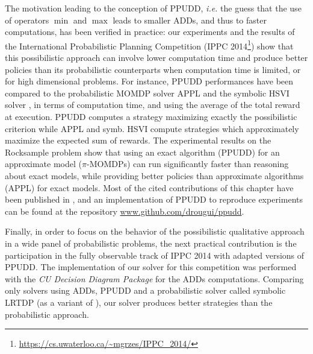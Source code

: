 The motivation leading to the conception of PPUDD,
\textit{i.e.} the guess that the use of operators $\min$ and $\max$ 
leads to smaller ADDs, and thus to faster computations,
has been verified in practice:
our experiments and the results 
of the International Probabilistic Planning Competition (IPPC 2014\footnote{\url{https://cs.uwaterloo.ca/~mgrzes/IPPC_2014/}})
show that this possibilistic approach
can involve lower computation time
and produce better policies
than its probabilistic counterparts
when computation time is limited,
or for high dimensional problems.
For instance, 
PPUDD performances have been compared 
to the probabilistic MOMDP solver APPL \cite{Kurniawati-RSS08,OngShaoHsuWee-IJRR10}
and the symbolic HSVI solver \cite{Sim:2008:SHS:1620163.1620241},
in terms of computation time, 
and using the average of 
the total reward at execution. 
PPUDD computes a strategy maximizing 
exactly the possibilistic criterion 
while APPL and symb. HSVI compute strategies
which approximately maximize the expected sum of rewards.
The experimental results on the Rocksample problem 
show that using an exact algorithm 
(PPUDD) for an approximate model ($\pi$-MOMDPs) 
can run significantly faster 
than reasoning about exact models, 
while providing better policies 
than approximate algorithms (APPL) 
for exact models.
Most of the cited contributions of this chapter
have been published in \cite{DBLP:conf/aaai/DrougardTFD14},
and an implementation of PPUDD 
to reproduce experiments 
can be found 
at the repository \url{www.github.com/drougui/ppudd}.

Finally, in order to focus on the behavior 
of the possibilistic qualitative approach 
in a wide panel of probabilistic problems, 
the next practical contribution 
is the participation 
in the fully observable track of IPPC 2014
with adapted versions of PPUDD.
The implementation of our solver for this competition 
was performed with the \textit{CU Decision Diagram Package}
for the ADDs computations. 
Comparing only solvers using ADDs, 
PPUDD and a probabilistic solver 
called symbolic LRTDP \cite{symbLRTDP}
(as a variant of \cite{Bonet03labeledrtdp}),
our solver produces better strategies 
than the probabilistic approach.

